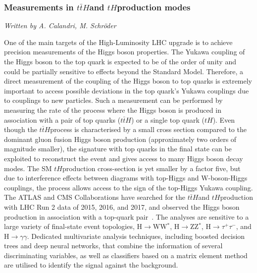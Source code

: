 \newcommand{\ttH}{\ensuremath{t\bar{t}H}}
\newcommand{\pt}{\ensuremath{p_{T}}}
\newcommand{\ptH}{\ensuremath{\pt^{H}}}

\newcommand{\tH}{\ensuremath{tH}}
\newcommand{\tHW}{\ensuremath{tHW}}
\newcommand{\tHQ}{\ensuremath{tHq}}
\newcommand{\VH}{\ensuremath{VH}}
\newcommand{\ggH}{\ensuremath{gg\rightarrow H}}
\newcommand{\mgg}{\ensuremath{m_{\gamma\gamma}}}
\newcommand{\ptgg}{\ensuremath{\pt^{\gamma\gamma}}}

\newcommand{\hgg}{\ensuremath{H\rightarrow\gamma\gamma}}


\subsubsection{Measurements in \ttH and \tH production modes}
\begin{center}{\it Written by A. Calandri, M. Schr\"oder} \end{center}

One of the main targets of the High-Luminosity LHC upgrade is to achieve precision measurements of the Higgs boson properties.
The Yukawa coupling of the Higgs boson to the top quark is expected to be of the order of unity and could be partially sensitive to effects beyond the Standard Model.
Therefore, a direct measurement of the coupling of the Higgs boson to top quarks is extremely important to access possible deviations in the top quark's Yukawa couplings due to couplings to new particles.
Such a measurement can be performed by measuring the rate of the process where the Higgs boson is produced in association with a pair of top quarks (\ttH) or a single top quark (\tH).
Even though the \ttH process is characterised by a small cross section compared to the dominant gluon fusion Higgs boson production (approximately two orders of magnitude smaller), the signature with top quarks in the final state can be exploited to reconstruct the event and gives access to many Higgs boson decay modes.
The SM \tH production cross-section is yet smaller by a factor five, but due to interference effects between diagrams with top-Higgs and W-boson-Higgs couplings, the process allows access to the sign of the top-Higgs Yukawa coupling.
The ATLAS and CMS Collaborations have searched for the \ttH and \tH production with LHC Run 2 data of 2015, 2016, and 2017, and observed the Higgs boson production in association with a top-quark pair~\cite{Aaboud:2018urx,Sirunyan:2018hoz}.
The analyses are sensitive to a large variety of final-state event topologies, H$\rightarrow$WW$^{*}$, H$\rightarrow$ZZ$^{*}$, H$\rightarrow \tau^{+}\tau^{-}$, \Htobb and H$\rightarrow \gamma\gamma$.
Dedicated multivariate analysis techniques, including boosted decision trees and deep neural networks, that combine the information of several discriminating variables, as well as classifiers based on a matrix element method are utilised to identify the signal against the background.

